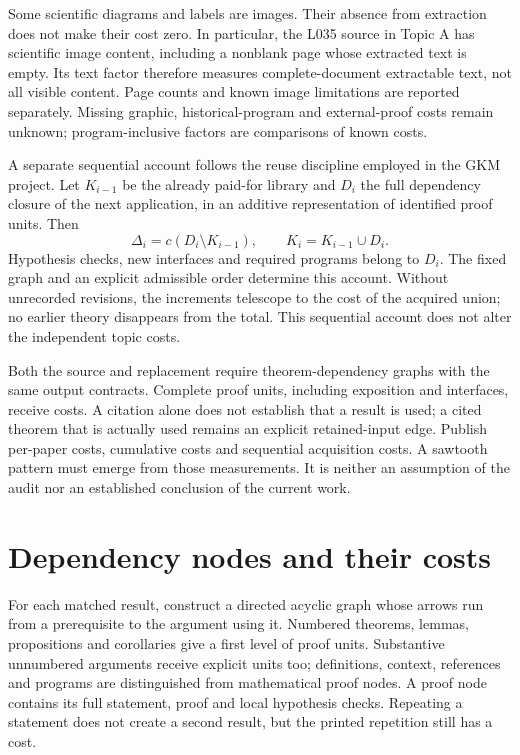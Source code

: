 \documentclass[11pt,a4paper]{article}
\begin{document}
Some scientific diagrams and labels are images. Their absence from extraction
does not make their cost zero. In particular, the L035 source in Topic A has
scientific image content, including a nonblank page whose extracted text is
empty. Its text factor therefore measures complete-document extractable text,
not all visible content. Page counts and known image limitations are reported
separately. Missing graphic, historical-program and external-proof costs
remain unknown; program-inclusive factors are comparisons of known costs.

A separate sequential account follows the reuse discipline employed in
the GKM project. Let $K_{i-1}$ be the already paid-for library and $D_i$
the full dependency closure of the next application, in an additive
representation of identified proof units. Then
\[
 \Delta_i=c(D_i\setminus K_{i-1}),\qquad
 K_i=K_{i-1}\cup D_i.
\]
Hypothesis checks, new interfaces and required programs belong to $D_i$.
The fixed graph and an explicit admissible order determine this account.
Without unrecorded revisions, the increments telescope to the cost of
the acquired union; no earlier theory disappears from the total.
This sequential account does not alter the independent topic costs.

Both the source and replacement require theorem-dependency graphs with
the same output contracts. Complete proof units, including exposition
and interfaces, receive costs. A citation alone does not establish that
a result is used; a cited theorem that is actually used remains an explicit
retained-input edge.
Publish per-paper costs, cumulative costs and sequential acquisition
costs. A sawtooth pattern must emerge from those measurements. It is
neither an assumption of the audit nor an established conclusion of the
current work.

\section{Dependency nodes and their costs}

For each matched result, construct a directed acyclic graph whose arrows
run from a prerequisite to the argument using it. Numbered theorems,
lemmas, propositions and corollaries give a first level of proof units.
Substantive unnumbered arguments receive explicit units too; definitions,
context, references and programs are distinguished from mathematical
proof nodes. A proof node contains its full statement, proof and local
hypothesis checks. Repeating a statement does not create a second result,
but the printed repetition still has a cost.
\end{document}
